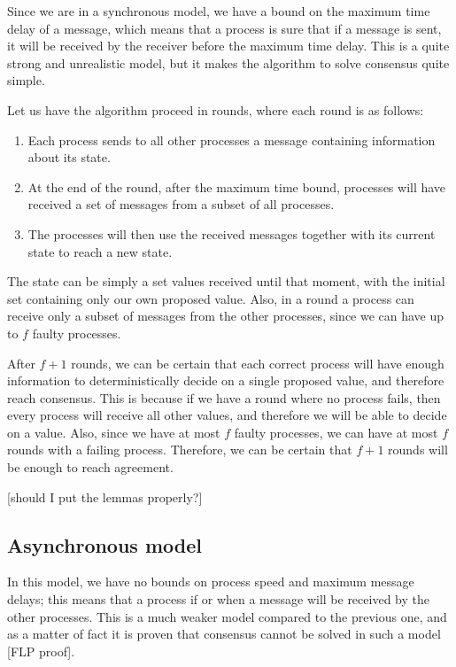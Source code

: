 Since we are in a synchronous model, we have a bound on the maximum time delay of a message, which means that a process is sure that if a message is sent, it will be received by the receiver before the maximum time delay. This is a quite strong and unrealistic model, but it makes the algorithm to solve consensus quite simple.

Let us have the algorithm proceed in rounds, where each round is as follows:
\begin{enumerate}
    \item Each process sends to all other processes a message containing information about its state.
    \item At the end of the round, after the maximum time bound, processes will have received a set of messages from a subset of all processes.
    \item The processes will then use the received messages together with its current state to reach a new state.
\end{enumerate}

The state can be simply a set values received until that moment, with the initial set containing only our own proposed value. Also, in a round a process can receive only a subset of messages from the other processes, since we can have up to $f$ faulty processes.

After $f+1$ rounds, we can be certain that each correct process will have enough information to deterministically decide on a single proposed value, and therefore reach consensus. This is because if we have a round where no process fails, then every process will receive all other values, and therefore we will be able to decide on a value. Also, since we have at most $f$ faulty processes, we can have at most $f$ rounds with a failing process. Therefore, we can be certain that $f+1$ rounds will be enough to reach agreement.

[should I put the lemmas properly?]

\subsection{Asynchronous model}\label{sec:Asynchronous model}
In this model, we have no bounds on process speed and maximum message delays; this means that a process if or when a message will be received by the other processes. This is a much weaker model compared to the previous one, and as a matter of fact it is proven that consensus cannot be solved in such a model [FLP proof].

